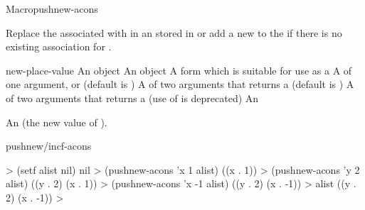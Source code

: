\documentclass[10pt,twoside,english,pdftex]{article}
\begin{document}
\begin{functiondoc}{Macro}{pushnew-acons}{ 
     
    \returns{} } 
%
%
%
%
  
\fnsyntax

\fnpurpose Replace the  associated with  in an 
 stored in  or add a new   to the  if there is no 
existing association for .

\fnpackage {}

\fnmodule {}

\fnargs
\begin{args}{new-place-value}
\arg[item] An object
\arg[value] An object
\arg[place] A form which is suitable for use as a
\arg[key] A  of one argument, or \nil{} (default is \nil)
\arg[test] A  of two arguments that returns a
 (default is ) 
 A  of two arguments that returns a
 (use of  is deprecated)
 An 
\end{args}

\fnreturns An  (the new value of
). 

\begin{alsos}{pushnew/incf-acons}
\end{alsos}

\fnexamples
%
\W\supp
\begin{example}
  > (setf alist nil)
  nil
  > (pushnew-acons 'x 1 alist)
  ((x . 1))
  > (pushnew-acons 'y 2 alist)
  ((y . 2) (x . 1))\goodpagebreak
  > (pushnew-acons 'x -1 alist)
  ((y . 2) (x . -1))
  > alist
  ((y . 2) (x . -1))
  >
\end{example}

\end{functiondoc}

\end{document}
